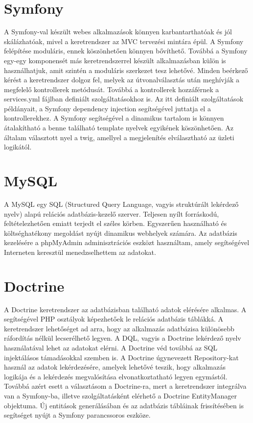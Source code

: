 \section*{Symfony}
A Symfony-val készült webes alkalmazások könnyen karbantarthatóak és jól skálázhatóak, mivel a keretrendszer az MVC tervezési mintára épül.
A Symfony felépítése moduláris, ennek köszönhetően könnyen bővíthető.
Továbbá a Symfony egy-egy komponensét más keretrendszerrel készült alkalmazásban külön is használhatjuk, amit szintén a moduláris szerkezet tesz lehetővé.
Minden beérkező kérést a keretrendszer dolgoz fel, melyek az útvonalválasztás után meghívják a megfelelő kontrollerek metódusát.
Továbbá a kontrollerek hozzáférnek a services.yml fájlban definiált szolgáltatásokhoz is.
Az itt definiált szolgáltatások példányait, a Symfony dependency injection segítségével juttatja el a kontrollerekhez.
A Symfony segítségével a dinamikus tartalom is könnyen átalakítható a benne található template nyelvek egyikének köszönhetően.
Az általam választott nyel a twig, amellyel a megjelenítés elválasztható az üzleti logikától. 

\section*{MySQL}
A MySQL  egy SQL (Structured Query Language, vagyis struktúrált lekérdező nyelv) alapú relációs adatbázis-kezelő szerver.
Teljesen nyílt forráskodú, feltételezhetően emiatt terjedt el széles körben.
Egyszerűen használható és költséghatékony megoldást nyújt dinamikus webhelyek számára.
Az adatbázis kezelésére a phpMyAdmin adminisztrációs eszközt használtam, amely segítségével Interneten keresztül menedzselhettem az adatokat.

\section*{Doctrine}
A Doctrine keretrendszer az adatbázisban található adatok elérésére alkalmas.
A segítségével PHP osztályok képezhetőek le relációs adatbázis táblákká.
A keretrendszer lehetőséget ad arra, hogy az alkalmazás adatbázisa különösebb ráfordítás nélkül lecserélhető legyen.
A DQL, vagyis a Doctrine lekérdező nyelv használatával lehet az adatokat elérni.
A Doctrine véd továbbá az SQL injektálásos támadásokkal szemben is.
A Doctrine úgynevezett Repository-kat használ az adatok lekérdezésére, amelyek lehetővé teszik, hogy alkalmazás logikája és a lekérdezés megvalósítása elvonatkoztatható legyen egymástól.
Továbbá azért esett a választásom a Doctrine-ra, mert a keretrendszer integrálva van a Symfony-ba, illetve szolgáltatásként elérhető a Doctrine EntityManager objektuma.
Új entitások generálásában és az adatbázis tábláinak frissítésében is segítséget nyújt a Symfony parancssoros eszköze.













